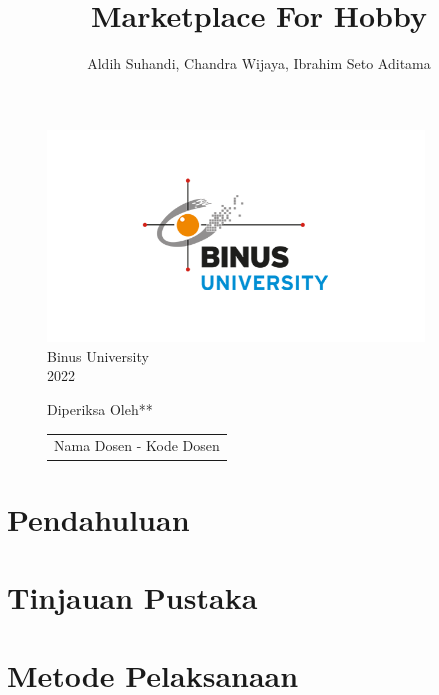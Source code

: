 \documentclass[a4paper]{article}
\begin{document}
\linespread{1.5}

\title{Marketplace For Hobby}
\author{Aldih Suhandi, Chandra Wijaya, Ibrahim Seto Aditama}

\maketitle
\begin{figure}[h]
    \centering
    \includegraphics[width=10cm]{logo_binus.png}\\
    Binus University\\
    2022
\end{figure}
\begin{figure}[h]
    \centering
    Diperiksa Oleh**\\
    \vspace{15mm}
    \begin{tabular}{@{}p{2.5in}@{}}
    \centering
    Nama Dosen - Kode Dosen
    \end{tabular}
\end{figure}

\newpage
{}
\tableofcontents

\newpage
\section*{Pendahuluan}

\newpage
\section*{Tinjauan Pustaka}

\newpage
\section*{Metode Pelaksanaan}
\end{document}
